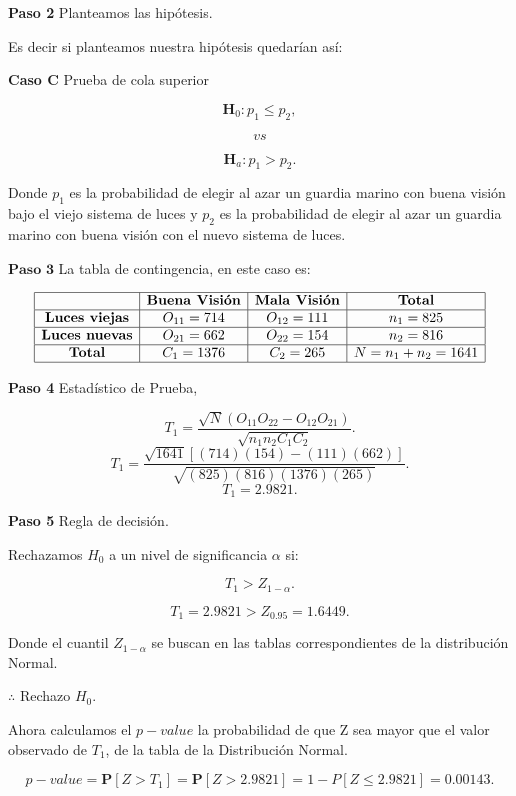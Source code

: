\documentclass[
  a4paper,
  oneside,
  openany]{book}
\begin{document}
\textbf{Paso 2} Planteamos las hipótesis.

Es decir si planteamos nuestra hipótesis quedarían así:

\textbf{Caso C} Prueba de cola superior

\[\textbf{H}_0: p_{1} \leq p_{2},\]

\[vs\]

\[\textbf{H}_a: p_{1} > p_{2}.\]

Donde \(p_{1}\) es la probabilidad de elegir al azar un guardia marino con buena visión bajo el viejo sistema de luces y \(p_{2}\) es la probabilidad de elegir al azar un guardia marino con buena visión con el nuevo sistema de luces.

\(\textbf{Paso 3}\) La tabla de contingencia, en este caso es:

\[
\begin{array}{|c|c|c|c|}
\hline
 & \textbf{Buena Visión} & \textbf{Mala Visión} & \textbf{Total}   \\
\hline
\textbf{Luces viejas} & O_{11}= 714 & O_{12}=111 & n_{1}=825   \\
\hline
\textbf{Luces nuevas} & O_{21}=662 & O_{22}=154 & n_{2}=816\\
\hline
\textbf{Total}  & C_{1}=1376 & C_{2}=265   & N=n_{1}+n_{2}=1641 \\
\hline
\end{array}
\]

\textbf{Paso 4} Estadístico de Prueba,

\[T_{1}=\frac{\sqrt{N}(O_{11}O_{22}-O_{12}O_{21})}{\sqrt{n_{1}n_{2}C_{1}C_{2}}}.\]
\[T_{1}=\frac{\sqrt{1641}[(714)(154)-(111)(662)]}{\sqrt{(825)(816)(1376)(265)}}.\]
\[T_{1}= 2.9821.\]

\textbf{Paso 5} Regla de decisión.

Rechazamos \(H_0\) a un nivel de significancia \(\alpha\) si:

\[T_{1} > Z_{1-\alpha}.\]

\[T_{1}=2.9821 > Z_{0.95}= 1.6449.\]

Donde el cuantil \(Z_{1-\alpha}\) se buscan en las tablas correspondientes de la distribución Normal.

\(\therefore\) Rechazo \(H_0\).

Ahora calculamos el \(p-value\) la probabilidad de que Z sea mayor que el valor observado de \(T_{1}\), de la tabla de la Distribución Normal.

\[p-value=\mathbf{P}[Z>T_{1}]=\mathbf{P}[Z>2.9821]=1-P[Z\leq2.9821]=0.00143.\]
\end{document}
